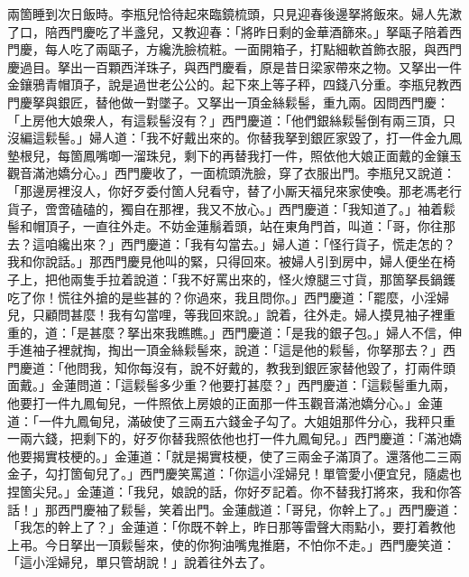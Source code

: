 兩箇睡到次日飯時。李瓶兒恰待起來臨鏡梳頭，只見迎春後邊拏將飯來。婦人先漱了口，陪西門慶吃了半盞兒，又教迎春：「將昨日剩的金華酒篩來。」拏甌子陪着西門慶，每人吃了兩甌子，方纔洗臉梳粧。一面開箱子，打點細軟首飾衣服，與西門慶過目。拏出一百顆西洋珠子，{}與西門慶看，原是昔日梁家帶來之物。又拏出一件金鑲鴉青帽頂子，說是過世老公公的。起下來上等子秤，四錢八分重。李瓶兒教西門慶拏與銀匠，替他做一對墜子。又拏出一頂金絲鬏髻，重九兩。因問西門慶：「上房他大娘衆人，有這鬏髻沒有？」西門慶道：「他們銀絲鬏髻倒有兩三頂，只沒編這鬏髻。」{}婦人道：「我不好戴出來的。你替我拏到銀匠家毀了，打一件金九鳳墊根兒，每箇鳳嘴啣一溜珠兒，剩下的再替我打一件，照依他大娘正面戴的金鑲玉觀音滿池嬌分心。」西門慶收了，一面梳頭洗臉，穿了衣服出門。李瓶兒又說道：「那邊房裡沒人，你好歹委付箇人兒看守，替了小厮天福兒來家使喚。那老馮老行貨子，啻啻磕磕的，獨自在那裡，我又不放心。」西門慶道：「我知道了。」袖着鬏髻和帽頂子，一直往外走。不妨金蓮鬅着頭，站在東角門首，{}叫道：「哥，你往那去？這咱纔出來？」{}西門慶道：「我有勾當去。」婦人道：「怪行貨子，慌走怎的？我和你說話。」那西門慶見他叫的緊，只得回來。被婦人引到房中，婦人便坐在椅子上，把他兩隻手拉着說道：「我不好罵出來的，怪火燎腿三寸貨，那箇拏長鍋鑊吃了你！慌往外搶的是些甚的？你過來，我且問你。」西門慶道：「罷麼，小淫婦兒，只顧問甚麼！我有勾當哩，等我回來說。」說着，往外走。婦人摸見袖子裡重重的，{}道：「是甚麼？拏出來我瞧瞧。」西門慶道：「是我的銀子包。」{}婦人不信，伸手進袖子裡就掏，掏出一頂金絲鬏髻來，說道：「這是他的鬏髻，{}你拏那去？」西門慶道：「他問我，知你每沒有，說不好戴的，教我到銀匠家替他毀了，打兩件頭面戴。」金蓮問道：「這鬏髻多少重？他要打甚麼？」西門慶道：「這鬏髻重九兩，他要打一件九鳳甸兒，一件照依上房娘的正面那一件玉觀音滿池嬌分心。」金蓮道：「一件九鳳甸兒，滿破使了三兩五六錢金子勾了。{}大姐姐那件分心，我秤只重一兩六錢，{}把剩下的，好歹你替我照依他也打一件九鳳甸兒。」西門慶道：「滿池嬌他要揭實枝梗的。」金蓮道：「就是揭實枝梗，使了三兩金子滿頂了。還落他二三兩金子，{}勾打箇甸兒了。」西門慶笑罵道：「你這小淫婦兒！單管愛小便宜兒，隨處也捏箇尖兒。」金蓮道：「我兒，娘說的話，你好歹記着。你不替我打將來，我和你答話！」那西門慶袖了鬏髻，笑着出門。金蓮戲道：「哥兒，你幹上了。」西門慶道：「我怎的幹上了？」金蓮道：「你既不幹上，昨日那等雷聲大雨點小，要打着教他上弔。今日拏出一頂鬏髻來，使的你狗油嘴鬼推磨，不怕你不走。」{}西門慶笑道：「這小淫婦兒，單只管胡說！」說着往外去了。

